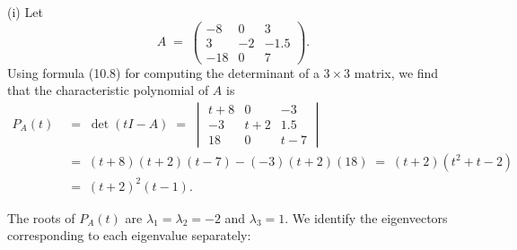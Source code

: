 (i) Let
\[
A \;=\; \begin{pmatrix} -8 & 0 & 3\\ 3 & -2 & -1.5\\ -18 & 0 & 7\end{pmatrix}.
\]
Using formula (10.8) for computing the determinant of a $3 \times 3$ matrix, we find
that the characteristic polynomial of $A$ is
\begin{align*}
P_A(t)
&\;=\; \det(tI-A) \;=\;
\begin{vmatrix} t+8 & 0 & -3\\ -3 & t+2 & 1.5\\ 18 & 0 & t-7\end{vmatrix}\\
&\;=\; (t+8)(t+2)(t-7) - (-3)(t+2)(18) \;=\; (t+2)(t^2+t-2)\\
&\;=\; (t+2)^2(t-1).
\end{align*}

The roots of $P_A(t)$ are $\lambda_1 = \lambda_2 = -2$ and $\lambda_3 = 1$. We identify
the eigenvectors corresponding to each eigenvalue separately:

